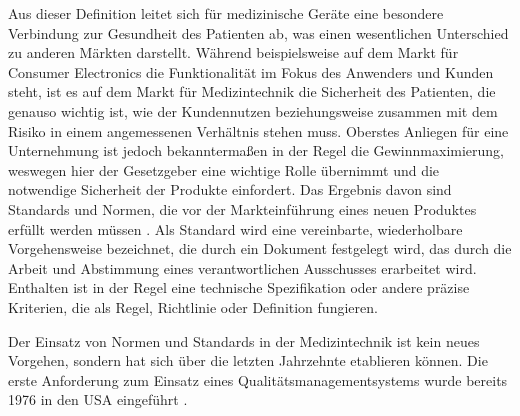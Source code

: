 \documentclass[a4paper,12pt]{report}
\begin{document}
Aus dieser Definition leitet sich für medizinische Geräte eine besondere Verbindung zur Gesundheit des Patienten ab, was einen wesentlichen Unterschied zu anderen Märkten darstellt. Während beispielsweise auf dem Markt für Consumer Electronics die Funktionalität im Fokus des Anwenders und Kunden steht, ist es auf dem Markt für Medizintechnik die Sicherheit des Patienten, die genauso wichtig ist, wie der Kundennutzen beziehungsweise zusammen mit dem Risiko in einem angemessenen Verhältnis stehen muss. Oberstes Anliegen für eine Unternehmung ist jedoch bekanntermaßen in der Regel die Gewinnmaximierung, weswegen hier der Gesetzgeber eine wichtige Rolle übernimmt und die notwendige Sicherheit der Produkte einfordert. Das Ergebnis davon sind Standards und Normen, die vor der Markteinführung eines neuen Produktes erfüllt werden müssen \citep[vgl.][S. 3]{Higson2002}. Als Standard wird eine vereinbarte, wiederholbare Vorgehensweise bezeichnet, die durch ein Dokument festgelegt wird, das durch die Arbeit und Abstimmung eines verantwortlichen Ausschusses erarbeitet wird. Enthalten ist in der Regel eine technische Spezifikation oder andere präzise Kriterien, die als Regel, Richtlinie oder Definition fungieren\citep[vgl.][S. 125-143]{Wong2013}.

Der Einsatz von Normen und Standards in der Medizintechnik ist kein neues Vorgehen, sondern hat sich über die letzten Jahrzehnte etablieren können. Die erste Anforderung zum Einsatz eines Qualitätsmanagementsystems wurde bereits 1976 in den USA eingeführt \citep[vgl.][S. 5]{Higson2002}.
\end{document}
